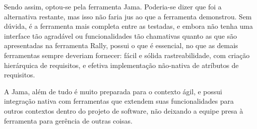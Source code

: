 Sendo assim, optou-se pela ferramenta Jama. Poderia-se dizer que foi a alternativa restante, mas isso não faria jus ao que a ferramenta demonstrou. Sem dúvida, é a ferramenta mais completa entre as testadas, e embora não tenha uma interface tão agradável ou funcionalidades tão chamativas quanto as que são apresentadas na ferramenta Rally, possui o que é essencial, no que as demais ferramentas sempre deveriam fornecer: fácil e sólida rastreabilidade, com criação hierárquica de requisitos, e efetiva implementação não-nativa de atríbutos de requisitos.

A Jama, além de tudo é muito preparada para o contexto ágil, e possui integração nativa com ferramentas que extendem suas funcionalidades para outros contextos dentro do projeto de software, não deixando a equipe presa à ferramenta para gerência de outras coisas.
